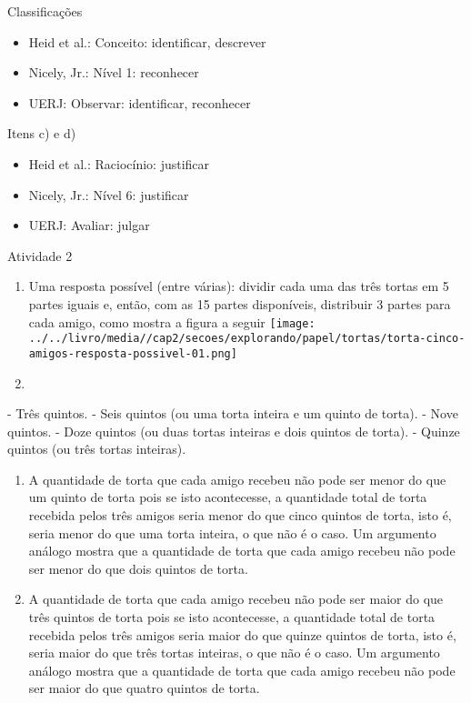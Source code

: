 \documentclass[oneside]{book}
\begin{document}
\begin{multicols}{2}
  Classificações
\begin{itemize} %
    \item       Heid et al.: Conceito: identificar, descrever
    \item       Nicely, Jr.: Nível 1: reconhecer
    \item       UERJ: Observar: identificar, reconhecer
\end{itemize} %

  Itens c) e d)
\begin{itemize} %
    \item       Heid et al.: Raciocínio: justificar
    \item       Nicely, Jr.: Nível 6: justificar
    \item       UERJ: Avaliar: julgar
\end{itemize} %







\begin{resposta*}{Atividade 2}
\begin{enumerate} [\quad I)] %
    \item       Uma resposta possível (entre várias): dividir cada uma das três tortas em 5 partes iguais e, então, com as 15 partes disponíveis, distribuir 3 partes para cada amigo, como mostra a figura a seguir       \mbox{} \newline                    \texttt{[image: ../../livro/media//cap2/secoes/explorando/papel/tortas/torta-cinco-amigos-resposta-possivel-01.png]}
    \item
\end{enumerate} %

          - Três quintos.
          - Seis quintos (ou uma torta inteira e um quinto de torta).
          - Nove quintos.
          - Doze quintos (ou duas tortas inteiras e dois quintos de torta).
          - Quinze quintos (ou três tortas inteiras).
\begin{enumerate} [\quad I)] %
    \item       A quantidade de torta que cada amigo recebeu não pode ser menor do que um quinto de torta pois se isto acontecesse, a quantidade total de torta recebida pelos três amigos seria menor do que cinco quintos de torta, isto é, seria menor do que uma torta inteira, o que não é o caso. Um argumento análogo mostra que a quantidade de torta que cada amigo recebeu não pode ser menor do que dois quintos de torta.
    \item       A quantidade de torta que cada amigo recebeu não pode ser maior do que três quintos de torta pois se isto acontecesse, a quantidade total de torta recebida pelos três amigos seria maior do que quinze quintos de torta, isto é, seria maior do que três tortas inteiras, o que não é o caso. Um argumento análogo mostra que a quantidade de torta que cada amigo recebeu não pode ser maior do que quatro quintos de torta.
\end{enumerate} %



\end{resposta*}
\end{multicols}
\end{document}
